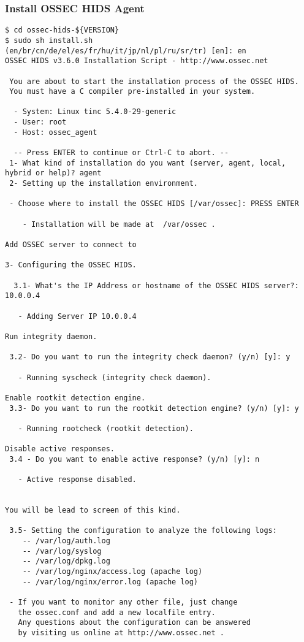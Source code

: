 \documentclass{article}
\begin{document}
\subsubsection{Install OSSEC HIDS Agent}
\begin{verbatim}
$ cd ossec-hids-${VERSION}
$ sudo sh install.sh
(en/br/cn/de/el/es/fr/hu/it/jp/nl/pl/ru/sr/tr) [en]: en
OSSEC HIDS v3.6.0 Installation Script - http://www.ossec.net

 You are about to start the installation process of the OSSEC HIDS.
 You must have a C compiler pre-installed in your system.

  - System: Linux tinc 5.4.0-29-generic
  - User: root
  - Host: ossec_agent

  -- Press ENTER to continue or Ctrl-C to abort. --
 1- What kind of installation do you want (server, agent, local, hybrid or help)? agent
 2- Setting up the installation environment.

 - Choose where to install the OSSEC HIDS [/var/ossec]: PRESS ENTER

    - Installation will be made at  /var/ossec .

Add OSSEC server to connect to

3- Configuring the OSSEC HIDS.

  3.1- What's the IP Address or hostname of the OSSEC HIDS server?: 10.0.0.4

   - Adding Server IP 10.0.0.4

Run integrity daemon. 

 3.2- Do you want to run the integrity check daemon? (y/n) [y]: y

   - Running syscheck (integrity check daemon).

Enable rootkit detection engine. 
 3.3- Do you want to run the rootkit detection engine? (y/n) [y]: y

   - Running rootcheck (rootkit detection).

Disable active responses. 
 3.4 - Do you want to enable active response? (y/n) [y]: n

   - Active response disabled.


You will be lead to screen of this kind. 

 3.5- Setting the configuration to analyze the following logs:
    -- /var/log/auth.log
    -- /var/log/syslog
    -- /var/log/dpkg.log
    -- /var/log/nginx/access.log (apache log)
    -- /var/log/nginx/error.log (apache log)

 - If you want to monitor any other file, just change
   the ossec.conf and add a new localfile entry.
   Any questions about the configuration can be answered
   by visiting us online at http://www.ossec.net .



\end{verbatim}
\end{document}
